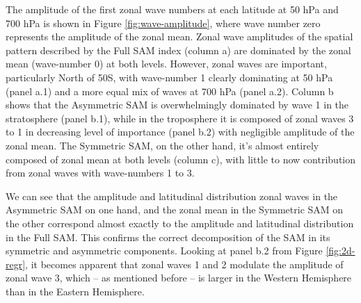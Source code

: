 \documentclass[]{ametsocV5}
\begin{document}
The amplitude of the first zonal wave numbers at each latitude at 50 hPa and 700 hPa is shown in Figure \ref{fig:wave-amplitude}, where wave number zero represents the amplitude of the zonal mean. Zonal wave amplitudes of the spatial pattern described by the Full SAM index (column a) are dominated by the zonal mean (wave-number 0) at both levels. However, zonal waves are important, particularly North of 50\degree S, with wave-number 1 clearly dominating at 50 hPa (panel a.1) and a more equal mix of waves at 700 hPa (panel a.2). Column b shows that the Asymmetric SAM is overwhelmingly dominated by wave 1 in the stratosphere (panel b.1), while in the troposphere it is composed of zonal waves 3 to 1 in decreasing level of importance (panel b.2) with negligible amplitude of the zonal mean. The Symmetric SAM, on the other hand, it's almost entirely composed of zonal mean at both levels (column c), with little to now contribution from zonal waves with wave-numbers 1 to 3.

We can see that the amplitude and latitudinal distribution zonal waves in the Asymmetric SAM on one hand, and the zonal mean in the Symmetric SAM on the other correspond almost exactly to the amplitude and latitudinal distribution in the Full SAM. This confirms the correct decomposition of the SAM in its symmetric and asymmetric components. Looking at panel b.2 from Figure \ref{fig:2d-regr}, it becomes apparent that zonal waves 1 and 2 modulate the amplitude of zonal wave 3, which -- as mentioned before -- is larger in the Western Hemisphere than in the Eastern Hemisphere.
\end{document}
